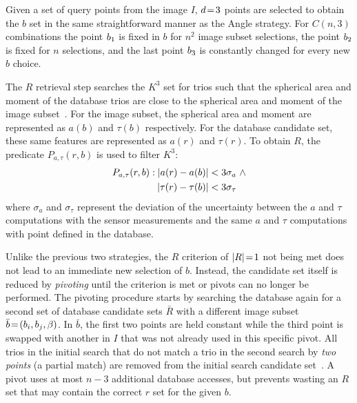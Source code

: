 Given a set of query points from the image $I$, $d \!=\! 3$ points are selected to obtain the $b$ set in the same
straightforward manner as the Angle strategy.
For $C(n, 3)$ combinations the point $b_1$ is fixed in $b$ for $n^2$ image subset selections,
the point $b_2$ is fixed for $n$ selections, and the last point $b_3$ is constantly changed for
every new $b$ choice.

The $R$ retrieval step searches the $K^3$ set for trios such that the spherical area and moment of the database
trios are close to the spherical area and moment of the image
subset~\cite{coleAndCrassidis:sphericalTriangleMethod}.
For the image subset, the spherical area and moment are represented as $a(b)$ and $\tau(b)$ respectively.
For the database candidate set, these same features are represented as $a(r)$ and $\tau(r)$.
To obtain $R$, the predicate $P_{a, \tau}(r, b)$ is used to filter $K^3$:
\begin{equation}
    \begin{aligned}
        P_{a, \tau}(r, b) : \left|  a(r) - a(b) \right| &< 3\sigma_{a}
        \ \land \\ \left| \tau(r) - \tau(b) \right| &< 3\sigma_{\tau}
    \end{aligned}
\end{equation}
where $\sigma_{a}$ and $\sigma_{\tau}$ represent the deviation of the uncertainty between the $a$ and $\tau$
computations with the sensor measurements and the same $a$ and $\tau$ computations with point defined in the
database.

Unlike the previous two strategies, the $R$ criterion of $|R| \!=\! 1$ not being met does not lead to an immediate new
selection of $b$.
Instead, the candidate set itself is reduced by \textit{pivoting} until the criterion is met or pivots can no longer
be performed.
The pivoting procedure starts by searching the database again for a second set of database candidate sets $\bar{R}$ with
a different image subset $\bar{b} \!=\! \left(b_i, b_j, \beta\right)$.
In $\bar{b}$, the first two points are held constant while the third point is swapped with another in $I$ that was not
already used in this specific pivot.
All trios in the initial search that do not match a trio in the second search by \textit{two points} (a partial
match) are removed from the initial search candidate set~\cite{coleAndCrassidis:sphericalTriangleMethod}.
A pivot uses at most $n - 3$ additional database accesses, but prevents wasting an $R$ set that may contain
the correct $r$ set for the given $b$.

